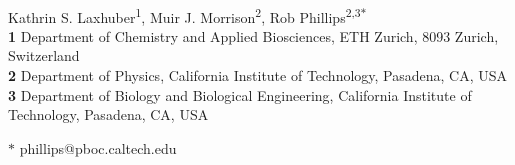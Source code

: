 \documentclass[10pt,letterpaper]{article}
\begin{document}
	\vspace*{0.2in}
	
	\begin{flushleft}
		{\Large
			\textbf{} %
		}
		\newline
		\\
		Kathrin S. Laxhuber\textsuperscript{1},
		Muir J. Morrison\textsuperscript{2},
		Rob Phillips\textsuperscript{2,3$\ast$}
		\\
		\bigskip
		\textbf{1} Department of Chemistry and Applied Biosciences, ETH Zurich, 8093 Zurich, Switzerland
		\\
		\textbf{2} Department of Physics, California Institute of Technology, Pasadena, CA, USA
		\\
		\textbf{3} Department of Biology and Biological Engineering, California Institute of Technology, Pasadena, CA, USA
		\\
		\bigskip
		
		
		
		
		$\ast$ phillips@pboc.caltech.edu
		
	\end{flushleft}
\end{document}
